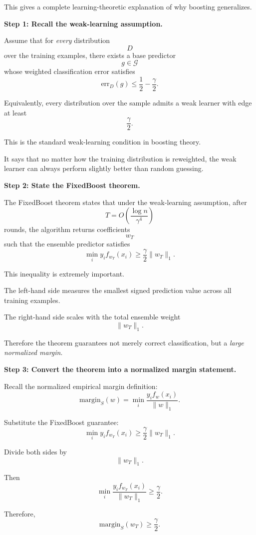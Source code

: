 \documentclass[11pt]{article}
\begin{document}
\begin{enumerate}
\begin{solutionbox}
This gives a complete learning-theoretic explanation of why boosting generalizes.

\medskip

\textbf{Step 1: Recall the weak-learning assumption.}

Assume that for \emph{every} distribution
\[
D
\]
over the training examples, there exists a base predictor
\[
g\in\mathcal G
\]
whose weighted classification error satisfies
\[
\mathrm{err}_D(g)
\le
\frac12-\frac\gamma2.
\]

Equivalently, every distribution over the sample admits a weak learner with edge at least
\[
\frac\gamma2.
\]

This is the standard weak-learning condition in boosting theory.

It says that no matter how the training distribution is reweighted, the weak learner can always perform slightly better than random guessing.

\medskip

\textbf{Step 2: State the FixedBoost theorem.}

The FixedBoost theorem states that under the weak-learning assumption, after
\[
T
=
O\left(
\frac{\log n}{\gamma^4}
\right)
\]
rounds, the algorithm returns coefficients
\[
w_T
\]
such that the ensemble predictor satisfies
\[
\min_i
y_if_{w_T}(x_i)
\ge
\frac\gamma2
\|w_T\|_1.
\]

This inequality is extremely important.

The left-hand side measures the smallest signed prediction value across all training examples.

The right-hand side scales with the total ensemble weight
\[
\|w_T\|_1.
\]

Therefore the theorem guarantees not merely correct classification, but a \emph{large normalized margin}.

\medskip

\textbf{Step 3: Convert the theorem into a normalized margin statement.}

Recall the normalized empirical margin definition:
\[
\mathrm{margin}_S(w)
=
\min_i
\frac{
y_if_w(x_i)
}{
\|w\|_1
}.
\]

Substitute the FixedBoost guarantee:
\[
\min_i
y_if_{w_T}(x_i)
\ge
\frac\gamma2
\|w_T\|_1.
\]

Divide both sides by
\[
\|w_T\|_1.
\]

Then
\[
\min_i
\frac{
y_if_{w_T}(x_i)
}{
\|w_T\|_1
}
\ge
\frac\gamma2.
\]

Therefore,
\[
\boxed{
\mathrm{margin}_S(w_T)
\ge
\frac\gamma2.
}
\]


\end{solutionbox}
\end{enumerate}
\end{document}
